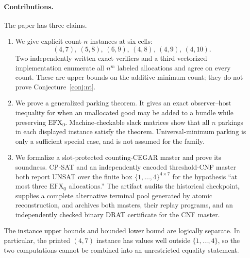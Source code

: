 \documentclass[11pt]{article}
\theoremstyle{plain}
\theoremstyle{definition}
\newcommand{\efxo}{\mathrm{EFX}_0}
\begin{document}
\paragraph{Contributions.}
The paper has three claims.
\begin{enumerate}[label=(\roman*),leftmargin=2.3em]
\item We give explicit count-$n$ instances at six cells:
\[
 (4,7),\ (5,8),\ (6,9),\ (4,8),\ (4,9),\ (4,10).
\]
Two independently written exact verifiers and a third vectorized implementation
enumerate all $n^m$ labeled allocations and agree on every count.  These are
upper bounds on the additive minimum count; they do not prove
Conjecture~\ref{conj:nt}.
\item We prove a generalized parking theorem.  It gives an exact
observer--host inequality for when an unallocated good may be added to a bundle
while preserving $\efxo$.  Machine-checkable slack matrices show that all $n$
parkings in each displayed instance satisfy the theorem.  Universal-minimum
parking is only a sufficient special case, and is not assumed for the family.
\item We formalize a slot-protected counting-CEGAR master and prove its soundness.
CP-SAT and an independently encoded threshold-CNF master both report UNSAT
over the finite box $\{1,\ldots,4\}^{4\times7}$ for the hypothesis ``at most
three $\efxo$ allocations.''  The artifact audits the historical checkpoint,
supplies a complete alternative terminal pool generated by atomic
reconstruction, and archives both masters, their replay programs, and an
independently checked binary DRAT certificate for the CNF master.
\end{enumerate}

The instance upper bounds and bounded lower bound are logically separate.  In
particular, the printed $(4,7)$ instance has values well outside
$\{1,\ldots,4\}$, so the two computations cannot be combined into an
unrestricted equality statement.
\end{document}
